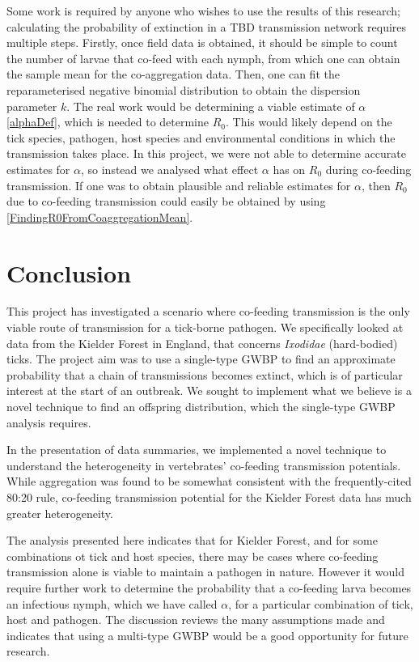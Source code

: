 \documentclass{article}
\begin{document}
Some work is required by anyone who wishes to use the results of this research; calculating the probability of extinction in a TBD transmission network requires multiple steps. Firstly, once field data is obtained, it should be simple to count the number of larvae that co-feed with each nymph, from which one can obtain the sample mean for the co-aggregation data. Then, one can fit the reparameterised negative binomial distribution to obtain the dispersion parameter $ k $. The real work would be determining a viable estimate of $ \alpha $ \eqref{alphaDef}, which is needed to determine $ R_0 $. This would likely depend on the tick species, pathogen, host species and environmental conditions in which the transmission takes place. In this project, we were not able to determine accurate estimates for $ \alpha $, so instead we analysed what effect $ \alpha $ has on $ R_0 $ during co-feeding transmission. If one was to obtain plausible and reliable estimates for $ \alpha $, then $ R_0 $ due to co-feeding transmission could easily be obtained by using \eqref{FindingR0FromCoaggregationMean}.

\newpage

\section{Conclusion}

This project has investigated a scenario where co-feeding transmission is the only viable route of transmission for a tick-borne pathogen. We specifically looked at data from the Kielder Forest in England, that concerns \textit{Ixodidae} (hard-bodied) ticks. The project aim was to use a single-type GWBP to find an approximate probability that a chain of transmissions becomes extinct, which is of particular interest at the start of an outbreak. We sought to implement what we believe is a novel technique to find an offspring distribution, which the single-type GWBP analysis requires.

In the presentation of data summaries, we implemented a novel technique to understand the heterogeneity in vertebrates' co-feeding transmission potentials. While aggregation was found to be somewhat consistent with the frequently-cited 80:20 rule, co-feeding transmission potential for the Kielder Forest data has much greater heterogeneity.

The analysis presented here indicates that for Kielder Forest, and for some combinations ot tick and host species, there may be cases where co-feeding transmission alone is viable to maintain a pathogen in nature. However it would require further work to determine the probability that a co-feeding larva becomes an infectious nymph, which we have called $ \alpha $, for a particular combination of tick, host and pathogen. The discussion reviews the many assumptions made and indicates that using a multi-type GWBP would be a good opportunity for future research.
\end{document}
